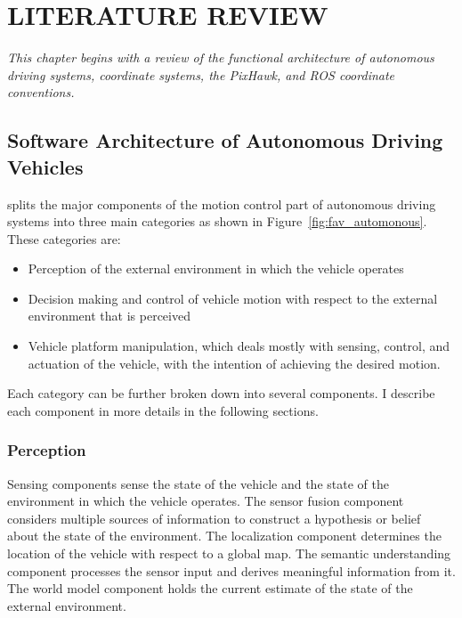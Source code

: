 \setlength{\parindent}{0.5in} 
\setlength{\parskip}{0mm}
\setlength{\baselineskip}{1.6em}

\chapter{LITERATURE REVIEW}
\label{ch:literature-review}

\textit{This chapter begins with a review of the functional architecture of autonomous driving systems, coordinate systems, the PixHawk, and ROS coordinate conventions.} 

\section{Software Architecture of Autonomous Driving Vehicles}
\label{section-name-in-literature-review}

 splits the major components of the motion control part of autonomous driving systems into three main categories as shown in Figure~\ref{fig:fav_automonous}. These categories are:

\begin{itemize}
	\item Perception of the external environment in which the vehicle operates
	\item Decision making and control of vehicle motion with respect to the external environment that is perceived
	\item Vehicle platform manipulation, which deals mostly with sensing, control, and actuation of the vehicle, with the intention of achieving the desired motion.
\end {itemize}

Each category can be further broken down into several components. I describe each component in more details in the following sections.

\subsection{Perception}

Sensing components sense the state of the vehicle and the state of the environment in which the vehicle operates. The sensor fusion component considers multiple sources of information to construct a hypothesis or belief about the state of the environment. The localization component determines the location of the vehicle with respect to a global map. The semantic understanding component processes the sensor input and derives meaningful information from it. The world model component holds the current estimate of the state of the external environment.

